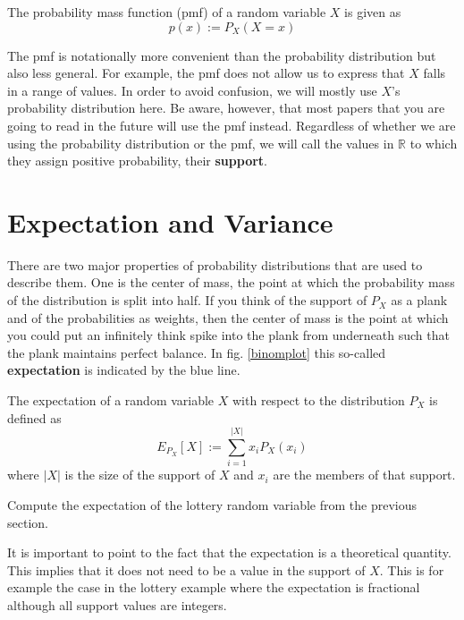 \documentclass[a4paper,11pt,leqno]{report}
\begin{document}
\begin{Definition}
The probability mass function (pmf) of a random variable $ X $ is given as
$$ p(x) := P_{X}(X = x) $$
\end{Definition}

The pmf is notationally more convenient than the probability distribution but also less general. For example, the pmf does not
allow us to express that $ X $ falls in a range of values. In order to avoid confusion, we will mostly use $ X $'s 
probability distribution here. Be aware, however, that most papers that you are going to read in the future will use the pmf
instead. Regardless of whether we are using the probability distribution or the pmf, we will call the values in $ \mathbb{R} $
to which they assign positive probability, their \textbf{support}.



\section{Expectation and Variance}

There are two major properties of probability distributions that are used to describe them. One is the center of mass, the point
at which the probability mass of the distribution is split into half. If you think of the support of $ P_{X} $ as a plank and 
of the probabilities as weights, then the center of mass is the point at which you could put an infinitely think spike into the
plank from underneath such that the plank maintains perfect balance. In fig. \ref{binomplot} this so-called \textbf{expectation}
is indicated by the blue line.

\begin{Definition}
The expectation of a random variable $ X $ with respect to the distribution $ P_{X} $ is defined as
$$ E_{P_{X}}[X] := \underset{i = 1}{\overset{|X|}{\sum}} x_{i}P_{X}(x_{i}) $$
where $ |X| $ is the size of the support of $ X $ and $ x_{i} $ are the members of that support.
\end{Definition}

\begin{Exercise}
Compute the expectation of the lottery random variable from the previous section.
\end{Exercise}

It is important to point to the fact that the expectation is a theoretical quantity. This implies that
it does not need to be a value in the support of $ X $. This is for example the case in the lottery example where the
expectation is fractional although all support values are integers.
\end{document}
